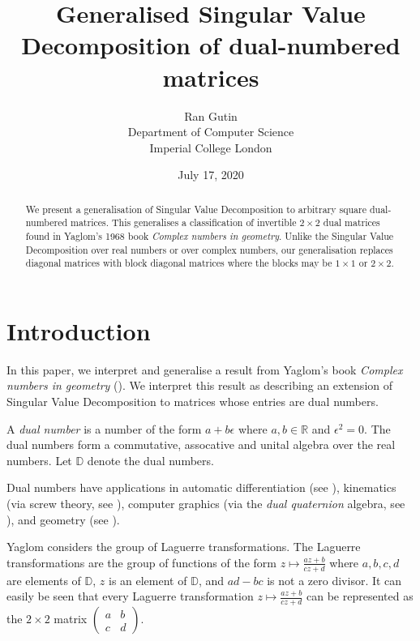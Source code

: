 \documentclass[
]{article}
\title{Generalised Singular Value Decomposition of dual-numbered matrices}
\author{Ran Gutin \\ Department of Computer Science \\ Imperial College London}
\date{July 17, 2020}
\theoremstyle{theorem}
\theoremstyle{proposition}
\begin{document}
\maketitle

\begin{abstract}
  We present a generalisation of Singular Value Decomposition to arbitrary square dual-numbered matrices. This generalises a classification of invertible $2 \times 2$ dual matrices found in Yaglom's 1968 book \emph{Complex numbers in geometry}. Unlike the Singular Value Decomposition over real numbers or over complex numbers, our generalisation replaces diagonal matrices with block diagonal matrices where the blocks may be $1 \times 1$ or $2 \times 2$.
\end{abstract}


\hypertarget{introduction}{%
\section{Introduction}\label{introduction}}

In this paper, we interpret and generalise a result from Yaglom's book \emph{Complex numbers in geometry} (\cite{1968}). We interpret this result as describing an extension of Singular Value Decomposition to matrices whose entries are dual numbers.

A \emph{dual number} is a number of the form $a+b\epsilon$ where $a, b \in \mathbb R$ and $\epsilon^2 = 0$. The dual numbers form a commutative, assocative and unital algebra over the real numbers. Let $\mathbb D$ denote the dual numbers.

Dual numbers have applications in automatic differentiation (see \cite{10.1007/s11075-015-0067-6}), kinematics (via screw theory, see \cite{Fischer1998DualNumberMI}), computer graphics (via the \emph{dual quaternion} algebra, see \cite{Kenwright_abeginners}), and geometry (see \cite{1968}).

Yaglom considers the group of Laguerre transformations. The Laguerre transformations are the group of functions of the form \(z \mapsto \frac{az + b}{cz + d}\) where \(a, b, c, d\) are elements of \(\mathbb D\), $z$ is an element of $\mathbb D$, and \(ad-bc\) is not a zero divisor. It can easily be seen that every Laguerre transformation \(z \mapsto \frac{az + b}{cz + d}\) can be represented as the $2 \times 2$ matrix \(\begin{pmatrix}a & b \\ c & d \end{pmatrix}\).
\end{document}
